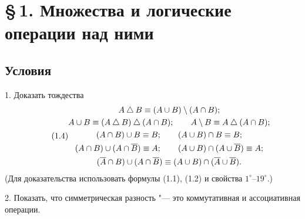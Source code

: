 \section*{\S\,1. Множества и логические операции над ними}
\subsection*{Условия}
1. Доказать тождества
\begin{equation}\tag{1.4}
\begin{gathered}
A\mathbin{\triangle} B\equiv(A\cup B)\setminus(A\cap B);\\
A\cup B\equiv(A\mathbin{\triangle} B)\mathbin{\triangle}(A\cap B);\qquad A\setminus B\equiv A\mathbin{\triangle}(A\cap B);\\
(A\cap B)\cup B\equiv B;\qquad (A\cup B)\cap B\equiv B;\\
(A\cap B)\cup(A\cap\overline{B})\equiv A;\qquad (A\cup B)\cap(A\cup\overline{B})\equiv A;\\
(\overline{A}\cap B)\cup(A\cap\overline{B})\equiv(A\cup B)\cap(\overline{A}\cup\overline{B}).
\end{gathered}
\end{equation}
(Для доказательства использовать формулы (1.1), (1.2) и свойства
$1^\circ$--$19^\circ$.)

2. Показать, что симметрическая разность "--- это коммутативная
и ассоциативная операции.

